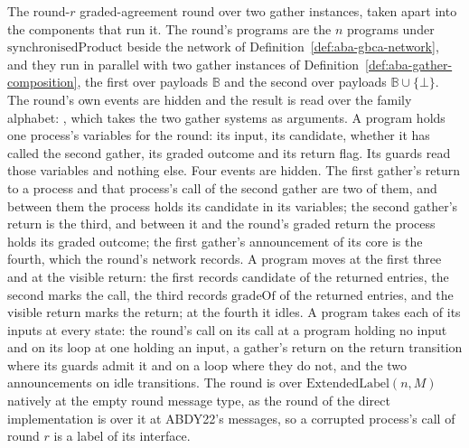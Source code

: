 \begin{definition}
  \label{def:aba-round-composition}
  \leanok
  The round-$r$ graded-agreement round over two gather instances, taken apart into the components that run it.
  The round's programs are the $n$ programs under $\mathrm{synchronisedProduct}$ beside the network of Definition~\ref{def:aba-gbca-network}, and they run in parallel with two gather instances of Definition~\ref{def:aba-gather-composition}, the first over payloads $\mathbb{B}$ and the second over payloads $\mathbb{B} \cup \{\bot\}$.
  The round's own events are hidden and the result is read over the family alphabet: , which takes the two gather systems as arguments.
  A program holds one process's variables for the round: its input, its candidate, whether it has called the second gather, its graded outcome and its return flag.
  Its guards read those variables and nothing else.
  Four events are hidden.
  The first gather's return to a process and that process's call of the second gather are two of them, and between them the process holds its candidate in its variables; the second gather's return is the third, and between it and the round's graded return the process holds its graded outcome; the first gather's announcement of its core is the fourth, which the round's network records.
  A program moves at the first three and at the visible return: the first records $\mathrm{candidate}$ of the returned entries, the second marks the call, the third records $\mathrm{gradeOf}$ of the returned entries, and the visible return marks the return; at the fourth it idles.
  A program takes each of its inputs at every state: the round's call on its call at a program holding no input and on its loop at one holding an input, a gather's return on the return transition where its guards admit it and on a loop where they do not, and the two announcements on idle transitions.
  The round is over $\mathrm{ExtendedLabel}(n, M)$ natively at the empty round message type, as the round of the direct implementation is over it at ABDY22's messages, so a corrupted process's call of round $r$ is a label of its interface.

\end{definition}
